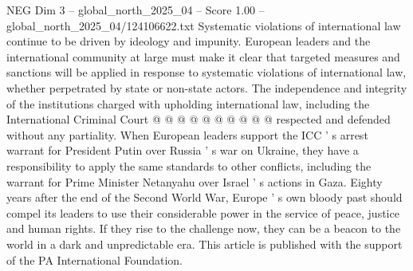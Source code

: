 \begin{textsample}{NEG Dim 3 – global\_north\_2025\_04 – Score 1.00 – global\_north\_2025\_04/124106622.txt}
Systematic violations of international law continue to be driven by ideology and impunity.
European leaders and the international community at large must make it clear that targeted measures and sanctions will be applied in response to systematic violations of international law, whether perpetrated by state or non-state actors.
The independence and integrity of the institutions charged with upholding international law, including the International Criminal Court @ @ @ @ @ @ @ @ @ @ respected and defended without any partiality.
When European leaders support the ICC ' s arrest warrant for President Putin over Russia ' s war on Ukraine, they have a responsibility to apply the same standards to other conflicts, including the warrant for Prime Minister Netanyahu over Israel ' s actions in Gaza.
Eighty years after the end of the Second World War, Europe ' s own bloody past should compel its leaders to use their considerable power in the service of peace, justice and human rights.
If they rise to the challenge now, they can be a beacon to the world in a dark and unpredictable era.
This article is published with the support of the PA International Foundation.

\end{textsample}
